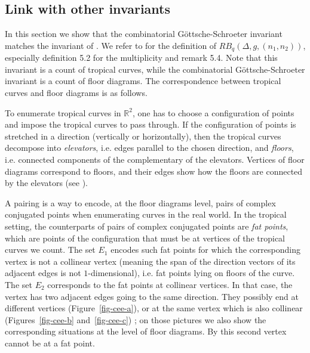 \documentclass[11pt]{article}
\theoremstyle{definition}
\numberwithin{equation}{section}
\newcommand{\R}{\mathbb{R}}
\theoremstyle{plain}
\begin{document}
\subsection{Link with other invariants}

In this section we show that the combinatorial Göttsche-Schroeter invariant matches the invariant of \cite[Theorem 5.8]{shustin-2024-refined}. 
We refer to \cite[Section~5]{shustin-2024-refined} for the definition of $RB_q(\Delta,g,(n_1,n_2))$, especially definition 5.2 for the multiplicity and remark 5.4. Note that this invariant is a count of tropical curves, while the combinatorial Göttsche-Schroeter invariant is a count of floor diagrams. The correspondence between tropical curves and floor diagrams is as follows.


To enumerate tropical curves in $\R^2$, one has to choose a configuration of points and impose the tropical curves to pass through. If the configuration of points is stretched in a direction (vertically or horizontally), then the tropical curves decompose into \emph{elevators}, i.e.  edges parallel to the chosen direction, and \emph{floors}, i.e.  connected components of the complementary of the elevators. Vertices of floor diagrams correspond to floors, and their edges show how the floors are connected by the elevators (see \cite{brugalle_floor_2008}).


A pairing is a way to encode, at the floor diagrams level, pairs of complex conjugated points when enumerating curves in the real world. In the tropical setting, the counterparts of pairs of complex conjugated points are \emph{fat points}, which are points of the configuration that must be at vertices of the tropical curves we count. 
The set $E_1$ encodes such fat points for which the corresponding vertex is not a collinear vertex (meaning the span of the direction vectors of its adjacent edges is not $1$-dimensional), i.e.  fat points lying on floors of the curve. 
The set $E_2$ corresponds to the fat points at collinear vertices. In that case, the vertex has two adjacent edges going to the same direction. They possibly end at different vertices (Figure~\ref{fig-cee-a}), or at the same vertex which is also collinear (Figures~\ref{fig-cee-b} and~\ref{fig-cee-c}) ; on those pictures we also show the corresponding situations at the level of floor diagrams. By \cite[Lemma 4.6]{shustin-2024-refined} this second vertex cannot be at a fat point.
\end{document}
